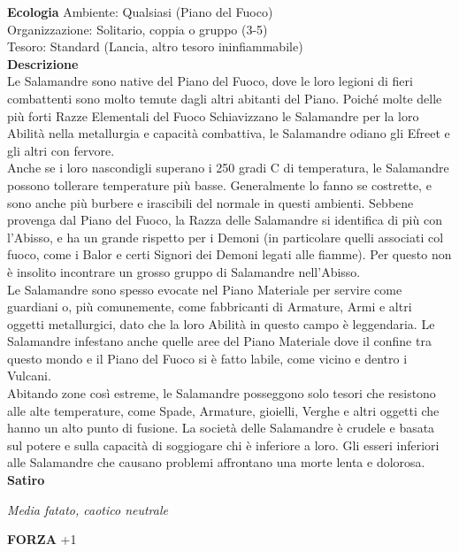 \begin{multicols}{2}
\textbf{Ecologia}
Ambiente: Qualsiasi (Piano del Fuoco)\\
Organizzazione: Solitario, coppia o gruppo (3-5)\\
Tesoro: Standard (Lancia, altro tesoro ininfiammabile)\\
\textbf{Descrizione}\\
Le Salamandre sono native del Piano del Fuoco, dove le loro legioni di fieri combattenti sono molto temute dagli altri abitanti del Piano. Poiché molte delle più forti Razze Elementali del Fuoco Schiavizzano le Salamandre per la loro Abilità nella metallurgia e capacità combattiva, le Salamandre odiano gli Efreet e gli altri con fervore.\\

Anche se i loro nascondigli superano i 250 gradi C di temperatura, le Salamandre possono tollerare temperature più basse. Generalmente lo fanno se costrette, e sono anche più burbere e irascibili del normale in questi ambienti. Sebbene provenga dal Piano del Fuoco, la Razza delle Salamandre si identifica di più con l'Abisso, e ha un grande rispetto per i Demoni (in particolare quelli associati col fuoco, come i Balor e certi Signori dei Demoni legati alle fiamme). Per questo non è insolito incontrare un grosso gruppo di Salamandre nell'Abisso.\\

Le Salamandre sono spesso evocate nel Piano Materiale per servire come guardiani o, più comunemente, come fabbricanti di Armature, Armi e altri oggetti metallurgici, dato che la loro Abilità in questo campo è leggendaria. Le Salamandre infestano anche quelle aree del Piano Materiale dove il confine tra questo mondo e il Piano del Fuoco si è fatto labile, come vicino e dentro i Vulcani.\\

Abitando zone così estreme, le Salamandre posseggono solo tesori che resistono alle alte temperature, come Spade, Armature, gioielli, Verghe e altri oggetti che hanno un alto punto di fusione. La società delle Salamandre è crudele e basata sul potere e sulla capacità di soggiogare chi è inferiore a loro. Gli esseri inferiori alle Salamandre che causano problemi affrontano una morte lenta e dolorosa.\\



\medskip{}\textbf{Satiro}

\emph{Media fatato, caotico neutrale}

\textbf{FORZA} +1


\end{multicols}
